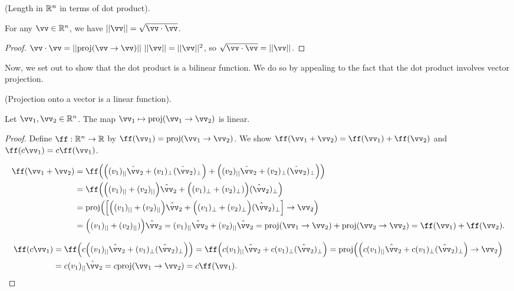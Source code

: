 \begin{theorem}
\label{ch::lin_alg::thm::length_in_Rn}
    (Length in $\mathbb{R}^n$ in terms of dot product).
    
    For any $\vv \in \R^n$, we have $||\vv|| = \sqrt{\vv \cdot \vv}$.
\end{theorem}

\begin{proof}
   $\vv \cdot \vv = ||\proj(\vv \rightarrow \vv)|| \spc ||\vv|| = ||\vv||^2$, so $\sqrt{\vv \cdot \vv} = ||\vv||$.
\end{proof}

Now, we set out to show that the dot product is a bilinear function. We do so by appealing to the fact that the dot product involves vector projection. 

\begin{lemma}
    (Projection onto a vector is a linear function).
    
    Let $\vv_1, \vv_2 \in \R^n$. The map $\vv_1 \mapsto \proj(\vv_1 \rightarrow \vv_2)$ is linear.
\end{lemma}

\begin{proof}
    Define $\ff:\R^n \rightarrow \R$ by $\ff(\vv_1) = \proj(\vv_1 \rightarrow \vv_2)$. We show $\ff(\vv_1 + \vv_2) = \ff(\vv_1) + \ff(\vv_2)$ and $\ff(c\vv_1) = c\ff(\vv_1)$.
    
    \begin{align*}
        \ff(\vv_1 + \vv_2) &= \ff\Big(\Big((v_1)_{||}\hat{\vv}_2 + (v_1)_{\perp}(\hat{\vv}_2)_\perp \Big) + \Big((v_2)_{||}\hat{\vv}_2 + (v_2)_\perp (\hat{\vv}_2)_\perp \Big) \Big) \\
        &= \ff \Big(\Big((v_1)_{||} + (v_2)_{||} \Big) \hat{\vv}_2 + \Big((v_1)_\perp + (v_2)_\perp) \Big) (\hat{\vv}_2)_\perp \Big) \\
        &= \proj\Big(\Big[ \Big((v_1)_{||} + (v_2)_{||} \Big) \hat{\vv}_2 + \Big((v_1)_\perp + (v_2)_\perp \Big) (\hat{\vv}_2)_\perp \Big] \rightarrow \vv_2 \Big) \\
        &= \Big((v_1)_{||} + (v_2)_{||}) \Big) \hat{\vv}_2 = (v_1)_{||} \hat{\vv}_2 + (v_2)_{||} \hat{\vv}_2
        = \proj(\vv_1 \rightarrow \vv_2) + \proj(\vv_2 \rightarrow \vv_2) = \ff(\vv_1) + \ff(\vv_2).
    \end{align*}
    
    \begin{align*}
        \ff(c \vv_1) &= 
        \ff \Big(c \Big((v_1)_{||}\hat{\vv}_2 + (v_1)_{\perp}(\hat{\vv}_2)_\perp \Big) \Big) = 
        \ff\Big(c(v_1)_{||}\hat{\vv}_2 + c(v_1)_{\perp}(\hat{\vv}_2)_\perp \Big)
        = \proj\Big(\Big(c(v_1)_{||}\hat{\vv}_2 + c(v_1)_{\perp}(\hat{\vv}_2)_\perp \Big) \rightarrow \vv_2 \Big) \\
        &= c (v_1)_{||} \hat{\vv}_2 = c \proj(\vv_1 \rightarrow \vv_2) = c \ff(\vv_1).
    \end{align*}
\end{proof}

